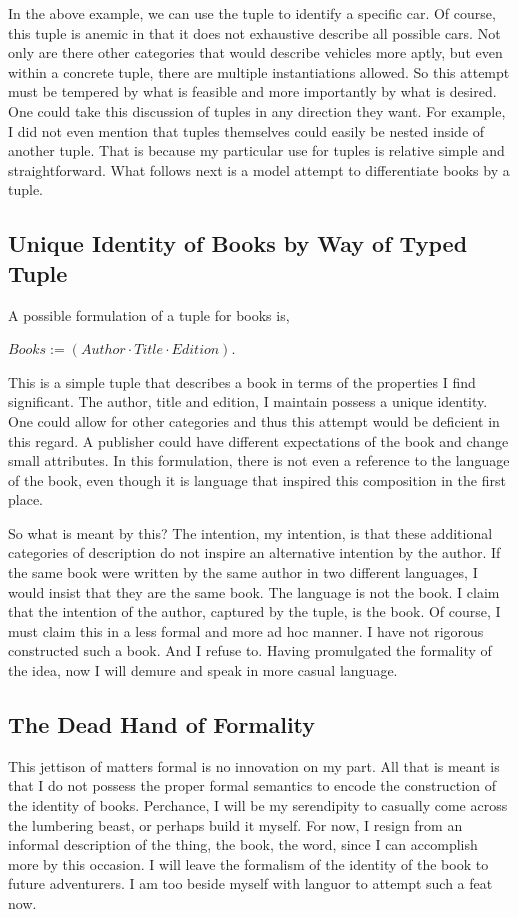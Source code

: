 \documentclass[12pt]{article}
\begin{document}
In the above example, we can use the tuple to identify a specific car. Of
course, this tuple is anemic in that it does not exhaustive describe all
possible cars. Not only are there other categories that would describe vehicles
more aptly, but even within a concrete tuple, there are multiple instantiations
allowed. So this attempt must be tempered by what is feasible and more
importantly by what is desired. One could take this discussion of tuples in any
direction they want. For example, I did not even mention that tuples themselves
could easily be nested inside of another tuple. That is because my particular
use for tuples is relative simple and straightforward. What follows next is a model attempt to
differentiate books by a tuple. 

\subsection{Unique Identity of Books by Way of Typed Tuple}
A possible formulation of a tuple for books is,

$Books := (Author \cdot Title \cdot Edition)$.

This is a simple tuple that describes a book in terms of the properties I find
significant. The author, title and edition, I maintain possess a unique
identity. One could allow for other categories and thus this attempt would be
deficient in this regard. A publisher could have different expectations of the
book and change small attributes. In this formulation, there is not even a
reference to the language of the book, even though it is language that inspired
this composition in the first place. 

So what is meant by this? The intention, my intention, is that these additional
categories of description do not inspire an alternative intention by the author.
If the same book were written by the same author in two different languages, I
would insist that they are the same book. The language is not the book. I claim
that the intention of the author, captured by the tuple, is the book. Of course,
I must claim this in a less formal and more ad hoc manner. I have not rigorous
constructed such a book. And I refuse to. Having promulgated the formality of
the idea, now I will demure and speak in more casual language.

\subsection{The Dead Hand of Formality}
This jettison of matters formal is no innovation on my part. All that is meant
is that I do not possess the proper formal semantics to encode the construction
of the identity of books. Perchance, I will be my serendipity to casually come
across the lumbering beast, or perhaps build it myself. For now, I resign from
an informal description of the thing, the book, the word, since I can accomplish
more by this occasion. I will leave the formalism of the identity of the book to
future adventurers. I am too beside myself with languor to attempt such a feat now. 
\end{document}
